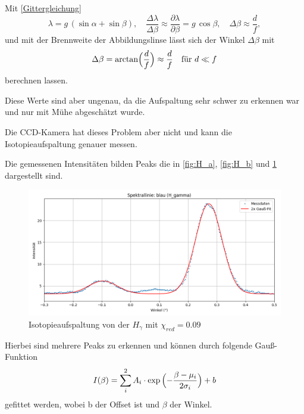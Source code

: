 Mit \cref{Gittergleichung}
\begin{equation}
  \lambda = g\,(\sin\alpha + \sin\beta),
  \quad
\frac{\Delta\lambda}{\Delta\beta} \approx 
  \frac{\partial\lambda}{\partial\beta} = g\,\cos\beta,
  \label{deltalambda}
  \quad
  \Delta\beta \approx \frac{d}{f},
\end{equation}
und mit der Brennweite der Abbildungslinse lässt sich der Winkel $\Delta\beta$ mit 
\begin{equation}
    \Delta\beta = \arctan\Bigl(\frac{d}{f}\Bigr) \approx \frac{d}{f} \quad \text{für } d \ll f
\end{equation}
berechnen lassen.

Diese Werte sind aber ungenau, da die Aufspaltung sehr schwer zu erkennen war und nur mit Mühe abgeschätzt wurde.

Die CCD-Kamera hat dieses Problem aber nicht und kann die Isotopieaufspaltung genauer messen.

Die gemessenen Intensitäten bilden Peaks die in \cref{fig:H_a}, \cref{fig:H_b} und \cref{fig:H_g} dargestellt sind. 
\begin{figure}
    \centering
    \includegraphics[width=\linewidth]{figs/dt_lila_145_51_5.png}
    \caption{Isotopieaufspaltung von der $H_{\gamma}$ mit $\chi_{red} = 0.09$}
    \label{fig:H_g}
\end{figure}

Hierbei sind mehrere Peaks zu erkennen und können durch folgende Gauß-Funktion 
\begin{equation}
    I(\beta) = \sum_i^2 A_i \cdot \exp{\Bigl(-\frac{\beta-\mu_i}{2\sigma_i}}\Bigr) +b
\end{equation}
gefittet werden, wobei b der Offset ist und $\beta$ der Winkel. 

